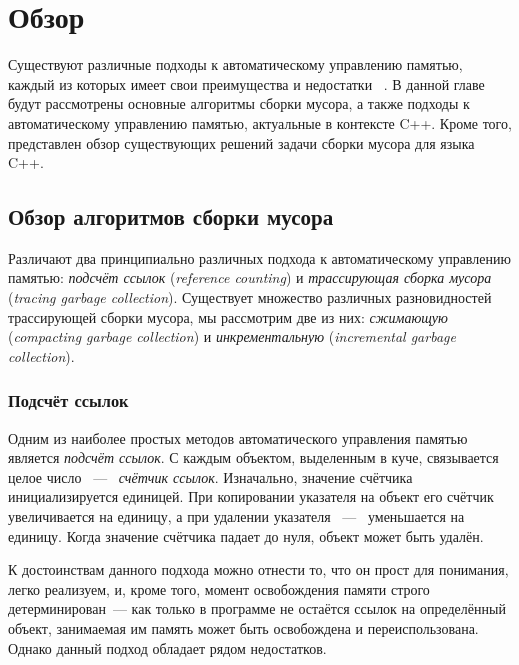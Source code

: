 \section{Обзор}

Существуют различные подходы к автоматическому управлению памятью, 
каждый из которых имеет свои преимущества и недостатки
~\cite{book:jones1996garbage,book:jones2011garbage}. 
В данной главе будут рассмотрены основные алгоритмы сборки мусора, 
а также подходы к автоматическому управлению памятью, актуальные в 
контексте C++. 
Кроме того, представлен обзор существующих решений задачи
сборки мусора для языка C++. 


\subsection{Обзор алгоритмов сборки мусора}

Различают два принципиально различных подхода к автоматическому управлению памятью: 
\emph{подсчёт ссылок} (\emph{reference counting}) и \emph{трассирующая сборка мусора} 
(\emph{tracing garbage collection}). 
Существует множество различных разновидностей трассирующей сборки мусора, 
мы рассмотрим две из них: \emph{сжимающую} (\emph{compacting garbage collection}) и 
\emph{инкрементальную} (\emph{incremental garbage collection}).


\subsubsection{Подсчёт ссылок}
\label{sec:ref_cnt}

Одним из наиболее простых методов автоматического управления памятью является 
\emph{подсчёт ссылок}. 
С каждым объектом, выделенным в куче, связывается целое число ~---~ \emph{счётчик ссылок}. 
Изначально, значение счётчика инициализируется единицей. 
При копировании указателя на объект его счётчик увеличивается на единицу, 
а при удалении указателя ~---~ уменьшается на единицу. 
Когда значение счётчика падает до нуля, объект может быть удалён. 

К достоинствам данного подхода можно отнести то, что он прост для понимания, 
легко реализуем, и, кроме того, момент освобождения памяти строго детерминирован~---
как только в программе не остаётся ссылок на определённый объект, 
занимаемая им память может быть освобождена и переиспользована. 
Однако данный подход обладает рядом недостатков.

